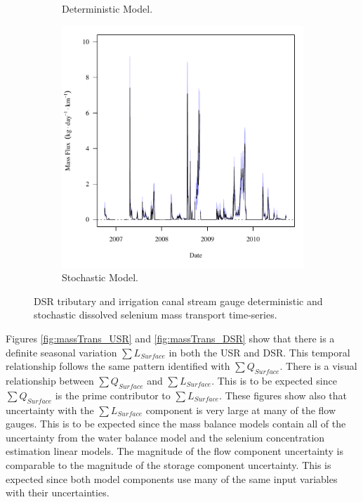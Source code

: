 \begin{linenumbers}
\begin{landscape}
\begin{figure}
\begin{subfigure}{0.7\textwidth}
			\caption{Deterministic Model.}
		\end{subfigure}%
		\begin{subfigure}{0.7\textwidth}
			\centering
			\includegraphics[width=\tableCustomSize]{"Figures/Results_DSR/Stochastic/f WIL"}
			\caption{Stochastic Model.}
		\end{subfigure}
		\caption{DSR tributary and irrigation canal stream gauge deterministic and stochastic dissolved selenium mass transport time-series.}
	\end{figure}
\end{landscape}

Figures \ref{fig:massTrans_USR} and \ref{fig:massTrans_DSR} show that there is a definite seasonal variation $ \sum L_{Surface} $ in both the USR and DSR.  This temporal relationship follows the same pattern identified with $ \sum Q_{Surface} $.  There is a visual relationship between $ \sum Q_{Surface} $ and $ \sum L_{Surface} $.  This is to be expected since $ \sum Q_{Surface} $ is the prime contributor to $ \sum L_{Surface} $.  These figures show also that uncertainty with the $ \sum L_{Surface} $ component is very large at many of the flow gauges.  This is to be expected since the mass balance models contain all of the uncertainty from the water balance model and the selenium concentration estimation linear models.  The magnitude of the flow component uncertainty is comparable to the magnitude of the storage component uncertainty.  This is expected since both model components use many of the same input variables with their uncertainties.


\end{linenumbers}
